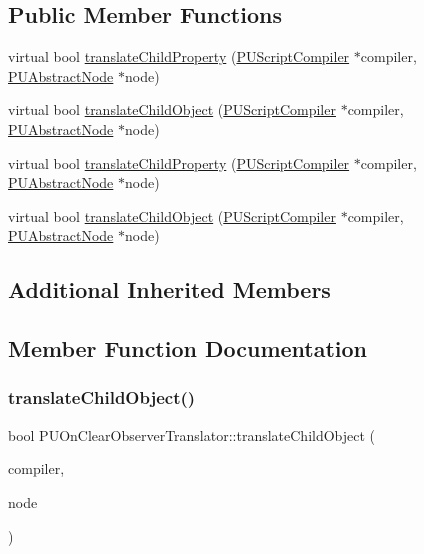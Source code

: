 \subsection*{Public Member Functions}
\begin{DoxyCompactItemize}
\item 
virtual bool \hyperlink{classPUOnClearObserverTranslator_ac3952c25c6181ffa759b3cd12f909bb8}{translate\+Child\+Property} (\hyperlink{classPUScriptCompiler}{P\+U\+Script\+Compiler} $\ast$compiler, \hyperlink{classPUAbstractNode}{P\+U\+Abstract\+Node} $\ast$node)
\item 
virtual bool \hyperlink{classPUOnClearObserverTranslator_a2a1853aa8c61f67a7bd39928ad58582e}{translate\+Child\+Object} (\hyperlink{classPUScriptCompiler}{P\+U\+Script\+Compiler} $\ast$compiler, \hyperlink{classPUAbstractNode}{P\+U\+Abstract\+Node} $\ast$node)
\item 
virtual bool \hyperlink{classPUOnClearObserverTranslator_ad37d1a237797fdb41d43321ea507e1fe}{translate\+Child\+Property} (\hyperlink{classPUScriptCompiler}{P\+U\+Script\+Compiler} $\ast$compiler, \hyperlink{classPUAbstractNode}{P\+U\+Abstract\+Node} $\ast$node)
\item 
virtual bool \hyperlink{classPUOnClearObserverTranslator_aaf881fa586405a988d625e73eb8f18f0}{translate\+Child\+Object} (\hyperlink{classPUScriptCompiler}{P\+U\+Script\+Compiler} $\ast$compiler, \hyperlink{classPUAbstractNode}{P\+U\+Abstract\+Node} $\ast$node)
\end{DoxyCompactItemize}
\subsection*{Additional Inherited Members}


\subsection{Member Function Documentation}
\mbox{\label{classPUOnClearObserverTranslator_a2a1853aa8c61f67a7bd39928ad58582e}} 
\subsubsection{\texorpdfstring{translate\+Child\+Object()}{translateChildObject()}\hspace{0.1cm}{\footnotesize\ttfamily [1/2]}}
{\footnotesize\ttfamily bool P\+U\+On\+Clear\+Observer\+Translator\+::translate\+Child\+Object (\begin{DoxyParamCaption}\item[{\hyperlink{classPUScriptCompiler}{P\+U\+Script\+Compiler} $\ast$}]{compiler,  }\item[{\hyperlink{classPUAbstractNode}{P\+U\+Abstract\+Node} $\ast$}]{node }\end{DoxyParamCaption})\hspace{0.3cm}{\ttfamily [virtual]}}

